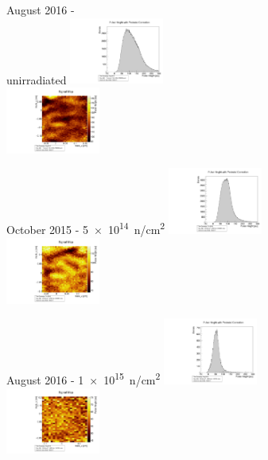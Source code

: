 \documentclass[9pt]{beamer}
\begin{document}
\begin{frame}
	\begin{minipage}{3.1cm}
		\centering
		August 2016 - \\unirradiated
		\includegraphics[angle=270, width=3.1cm]{SD462}\\
		\includegraphics[angle=270, width=3.1cm]{SM462}
	\end{minipage}
	\hspace*{2pt}
	\begin{minipage}{3.1cm}
		\centering
		October 2015 - \SI[exponent-product = \cdot]{5e14}{n/cm^{2}}
		\includegraphics[angle=270, width=3.1cm]{SD392}\\
		\includegraphics[angle=270, width=3.1cm]{SM392}
	\end{minipage}
	\hspace*{2pt}
	\begin{minipage}{3.1cm}
		\centering
		August 2016 - \SI[exponent-product = \cdot]{1e15}{n/cm^{2}}
		\includegraphics[angle=270, width=3.1cm]{SD555}\\
		\includegraphics[angle=270, width=3.1cm]{SM555}
	\end{minipage}\s
\end{frame}
\end{document}
